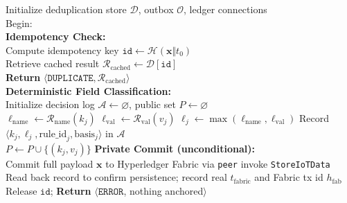 \documentclass[final,5p,times,twocolumn]{elsarticle}
\begin{document}
\begin{algorithm}[!htbp]
\scriptsize
\color{blue}
\caption{\textcolor{blue}{Pseudocode for deterministic policy-driven routing and commit}}
\label{alg:routing}
Initialize deduplication store $\mathcal{D}$, outbox $\mathcal{O}$, ledger connections \\
\BlankLine
Begin: \\
\textbf{Idempotency Check:} \\
Compute idempotency key $\texttt{id} \leftarrow \mathcal{H}(\mathbf{x}\Vert t_0)$ \\
 {
    Retrieve cached result $\mathcal{R}_{\text{cached}} \leftarrow \mathcal{D}[\texttt{id}]$ \\
    \textbf{Return} $\langle\mathtt{DUPLICATE}, \mathcal{R}_{\text{cached}}\rangle$ \\
}
\BlankLine
\textbf{Deterministic Field Classification:} \\
Initialize decision log $\mathcal{A} \leftarrow \varnothing$, public set $P \leftarrow \varnothing$ \\
 {
    $\ell_{\mathrm{name}} \leftarrow \mathcal{R}_{\mathrm{name}}(k_j)$ 
    $\ell_{\mathrm{val}}  \leftarrow \mathcal{R}_{\mathrm{val}}(v_j)$ 
    $\ell_j \leftarrow \max(\ell_{\mathrm{name}}, \ell_{\mathrm{val}})$ 
    Record $\langle k_j, \ell_j, \mathrm{rule\_id}_j, \mathrm{basis}_j\rangle$ in $\mathcal{A}$ \\
     {
        $P \leftarrow P \cup \{(k_j,v_j)\}$ 
    }
}
\BlankLine
\textbf{Private Commit (unconditional):} \\
Commit full payload $\mathbf{x}$ to Hyperledger Fabric via \texttt{peer} invoke \texttt{StoreIoTData} \\
Read back record to confirm persistence; record real $t_{\text{fabric}}$ and Fabric tx id $h_{\mathrm{fab}}$ \\
 {
    Release $\texttt{id}$; \textbf{Return} $\langle\mathtt{ERROR}$, nothing anchored$\rangle$ 
}
\end{algorithm}
\end{document}
